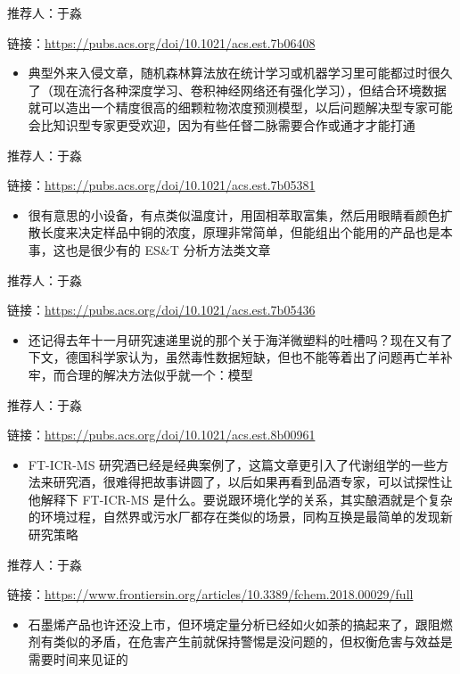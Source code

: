 \documentclass[]{book}
\providecommand{\tightlist}{%
  \setlength{\itemsep}{0pt}\setlength{\parskip}{0pt}}
\begin{document}
推荐人：于淼

链接：\url{https://pubs.acs.org/doi/10.1021/acs.est.7b06408}

\begin{itemize}
\tightlist
\item
  典型外来入侵文章，随机森林算法放在统计学习或机器学习里可能都过时很久了（现在流行各种深度学习、卷积神经网络还有强化学习），但结合环境数据就可以造出一个精度很高的细颗粒物浓度预测模型，以后问题解决型专家可能会比知识型专家更受欢迎，因为有些任督二脉需要合作或通才才能打通
\end{itemize}

推荐人：于淼

链接：\url{https://pubs.acs.org/doi/10.1021/acs.est.7b05381}

\begin{itemize}
\tightlist
\item
  很有意思的小设备，有点类似温度计，用固相萃取富集，然后用眼睛看颜色扩散长度来决定样品中铜的浓度，原理非常简单，但能组出个能用的产品也是本事，这也是很少有的
  ES\&T 分析方法类文章
\end{itemize}

推荐人：于淼

链接：\url{https://pubs.acs.org/doi/10.1021/acs.est.7b05436}

\begin{itemize}
\tightlist
\item
  还记得去年十一月研究速递里说的那个关于海洋微塑料的吐槽吗？现在又有了下文，德国科学家认为，虽然毒性数据短缺，但也不能等着出了问题再亡羊补牢，而合理的解决方法似乎就一个：模型
\end{itemize}

推荐人：于淼

链接：\url{https://pubs.acs.org/doi/10.1021/acs.est.8b00961}

\begin{itemize}
\tightlist
\item
  FT-ICR-MS
  研究酒已经是经典案例了，这篇文章更引入了代谢组学的一些方法来研究酒，很难得把故事讲圆了，以后如果再看到品酒专家，可以试探性让他解释下
  FT-ICR-MS
  是什么。要说跟环境化学的关系，其实酿酒就是个复杂的环境过程，自然界或污水厂都存在类似的场景，同构互换是最简单的发现新研究策略
\end{itemize}

推荐人：于淼

链接：\url{https://www.frontiersin.org/articles/10.3389/fchem.2018.00029/full}

\begin{itemize}
\tightlist
\item
  石墨烯产品也许还没上市，但环境定量分析已经如火如荼的搞起来了，跟阻燃剂有类似的矛盾，在危害产生前就保持警惕是没问题的，但权衡危害与效益是需要时间来见证的
\end{itemize}
\end{document}
